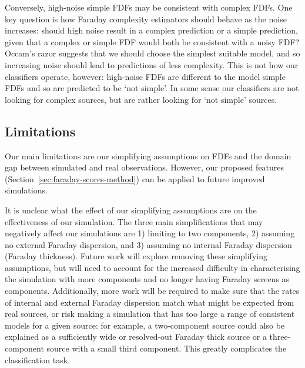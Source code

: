 \documentclass[11pt, a4paper]{book}
\begin{document}
    Conversely, high-noise simple FDFs may be consistent with complex FDFs. One key question is how Faraday complexity estimators should behave as the noise increases: should high noise result in a complex prediction or a simple prediction, given that a complex or simple FDF would both be consistent with a noisy FDF? Occam's razor suggests that we should choose the simplest suitable model, and so increasing noise should lead to predictions of less complexity. This is not how our classifiers operate, however: high-noise FDFs are different to the model simple FDFs and so are predicted to be `not simple'. In some sense our classifiers are not looking for complex sources, but are rather looking for `not simple' sources.

  \subsection{Limitations}
  \label{sec:faraday-limitations}

    Our main limitations are our simplifying assumptions on FDFs and the domain gap between simulated and real observations. However, our proposed features (Section~\autoref{sec:faraday-scores-method}) can be applied to future improved simulations.

    It is unclear what the effect of our simplifying assumptions are on the effectiveness of our simulation. The three main simplifications that may negatively affect our simulations are 1) limiting to two components, 2) assuming no external Faraday dispersion, and 3) assuming no internal Faraday dispersion (Faraday thickness). Future work will explore removing these simplifying assumptions, but will need to account for the increased difficulty in characterising the simulation with more components and no longer having Faraday screens as components. Additionally, more work will be required to make sure that the rates of internal and external Faraday dispersion match what might be expected from real sources, or risk making a simulation that has too large a range of consistent models for a given source: for example, a two-component source could also be explained as a sufficiently wide or resolved-out Faraday thick source or a three-component source with a small third component. This greatly complicates the classification task.
\end{document}

